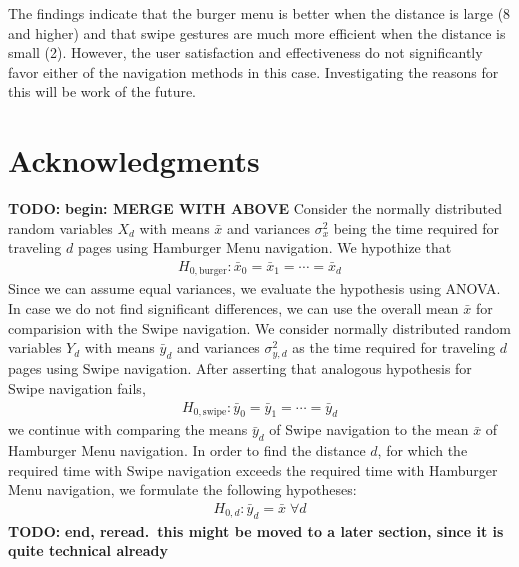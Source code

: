 \documentclass{sig-alternate-05-2015}
\newcommand{\todo}{\textbf{TODO:} \textbf}
\begin{document}
The findings indicate that the burger menu is better when the distance is large (8 and higher) and that swipe gestures are much more efficient
when the distance is small (2). However, the user satisfaction and effectiveness do not significantly favor either of the navigation methods in this case.
Investigating the reasons for this will be work of the future.

\section{Acknowledgments}

%

%
%
\newpage
\onecolumn
\appendix
\todo{begin: MERGE WITH ABOVE}
Consider the normally distributed random variables $X_d$ with means $\bar x$ and
variances $\sigma_x^2$ being the time required for traveling $d$ pages using Hamburger
Menu navigation.
We hypothize that
\begin{align*}
	H_{0, \text{burger}}: \bar x_0 = \bar x_1 = \cdots = \bar x_d
\end{align*}
Since we can assume equal variances,
we evaluate the hypothesis using {ANOVA}.
In case we do not find significant differences, we can use the overall mean
$\bar x$ for comparision with the Swipe navigation. 
We consider normally
distributed random variables $Y_d$ with means $\bar y_d$ and variances $\sigma_{y,d}^2$ as the
time required for traveling $d$ pages using Swipe navigation. 
After asserting
that analogous hypothesis for Swipe navigation fails,
\begin{align*}
	H_{0, \text{swipe}}: \bar y_0 = \bar y_1= \cdots = \bar y_d
\end{align*}
we continue with comparing the means $\bar y_d$ of Swipe navigation to the
mean $\bar x$ of Hamburger Menu navigation.  In order to find the distance
$d$, for which the required time with Swipe navigation exceeds the required
time with Hamburger Menu navigation, we formulate the following hypotheses:
\begin{align*}
	H_{0,d} : \bar y_d = \bar x \;\forall d
\end{align*}
\todo{end, reread.\ this might be moved to a later section, since it is
	quite technical already}
\end{document}
